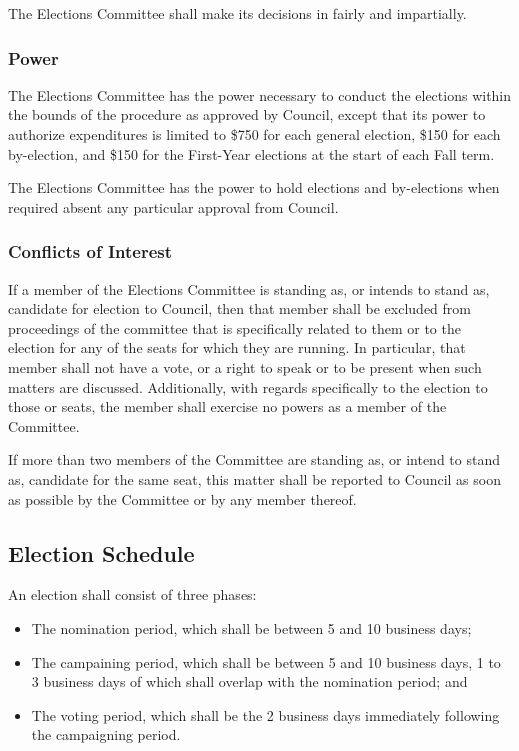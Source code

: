 The Elections Committee shall make its decisions in fairly and impartially.
\subsubsection{Power}
The Elections Committee has the power necessary to conduct the elections within
the bounds of the procedure as approved by Council, except that its power to
authorize expenditures is limited to \$750 for each general election, \$150
for each by-election, and \$150 for the First-Year elections at the start of
each Fall term.

The Elections Committee has the power to hold elections and by-elections when
required absent any particular approval from Council.

\subsubsection{Conflicts of Interest}
If a member of the Elections Committee is standing as, or intends to stand as,
candidate for election to Council, then that member shall be excluded from
proceedings of the committee that is specifically related to them or to the
election for any of the seats for which they are running. In particular, that
member shall not have a vote, or a right to speak or to be present when such
matters are discussed. Additionally, with regards specifically to the election
to those or seats, the member shall exercise no powers as a member of the
Committee.

If more than two members of the Committee are standing as, or intend to stand
as, candidate for the same seat, this matter shall be reported to Council as
soon as possible by the Committee or by any member thereof.

\subsection{Election Schedule}
An election shall consist of three phases:

\begin{itemize}
\item The nomination period, which shall be between 5 and 10 business days;
\item The campaining period, which shall be between 5 and 10 business days, 1 to
3 business days of which shall overlap with the nomination period; and
\item The voting period, which shall be the 2 business days immediately
following the campaigning period.
\end{itemize}

